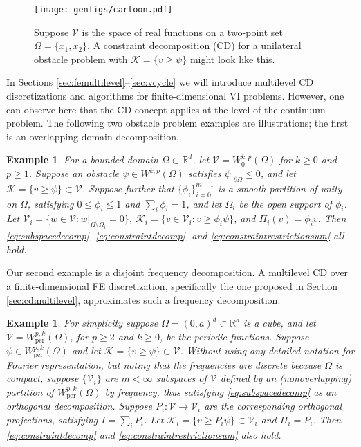 \documentclass[letterpaper,final,12pt,reqno]{amsart}
\theoremstyle{cstyle}
\theoremstyle{cstyle*}
\theoremstyle{dstyle}
\newtheorem{example}[theorem]{Example}
\numberwithin{equation}{section}
\numberwithin{figure}{section}
\numberwithin{table}{section}
\numberwithin{theorem}{section}
\newcommand{\RR}{\mathbb{R}}
\newcommand{\cK}{\mathcal{K}}
\newcommand{\cV}{\mathcal{V}}
\begin{document}
\begin{figure}[ht]
\texttt{[image: genfigs/cartoon.pdf]}
\caption{Suppose $\mathcal{V}$ is the space of real functions on a two-point set $\Omega=\{x_1,x_2\}$.  A constraint decomposition (CD) for a unilateral obstacle problem with $\mathcal{K}=\{v\ge \psi\}$ might look like this.}
\label{fig:cartoon}
\end{figure}

In Sections \ref{sec:femultilevel}--\ref{sec:vcycle} we will introduce multilevel CD discretizations and algorithms for finite-dimensional VI problems.  However, one can observe here that the CD concept applies at the level of the continuum problem.  The following two obstacle problem examples are illustrations; the first is an overlapping domain decomposition.

\begin{example}  \label{ex:domaindecomposition}  For a bounded domain $\Omega \subset \RR^d$, let $\cV = W_0^{k,p}(\Omega)$ for $k\ge 0$ and $p\ge 1$.  Suppose an obstacle $\psi \in W^{k,p}(\Omega)$ satisfies $\psi|_{\partial \Omega} \le 0$, and let $\cK = \{v \ge \psi\} \subset \cV$.  Suppose further that $\{\phi_i\}_{i=0}^{m-1}$ is a smooth partition of unity on $\Omega$, satisfying $0 \le \phi_i\le 1$ and $\sum_i \phi_i = 1$, and let $\Omega_i$ be the open support of $\phi_i$.  Let $\cV_i = \{w \in \cV:w|_{\Omega \setminus \Omega_i} =0 \}$, $\cK_i = \{v \in \cV_i: v \ge \phi_i \psi\}$, and $\Pi_i(v) = \phi_i v$.  Then \eqref{eq:subspacedecomp}, \eqref{eq:constraintdecomp}, and \eqref{eq:constraintrestrictionsum} all hold.
\end{example}

Our second example is a disjoint frequency decomposition.  A multilevel CD over a finite-dimensional FE discretization, specifically the one proposed in Section \ref{sec:cdmultilevel}, approximates such a frequency decomposition.

\begin{example}  \label{ex:frequencydecomposition}  For simplicity suppose $\Omega = (0,a)^d \subset \RR^d$ is a cube, and let $\cV = W_{\text{per}}^{p,k}(\Omega)$, for $p\ge 2$ and $k\ge 0$, be the periodic functions.  Suppose $\psi \in W_{\text{per}}^{p,k}(\Omega)$ and let $\cK = \{v \ge \psi\} \subset \cV$.  Without using any detailed notation for Fourier representation, but noting that the frequencies are discrete because $\Omega$ is compact, suppose $\{\cV_i\}$ are $m<\infty$ subspaces of $\cV$ defined by an (nonoverlapping) partition of $W_{\text{per}}^{p,k}(\Omega)$ by frequency, thus satisfying \eqref{eq:subspacedecomp} as an orthogonal decomposition.  Suppose $P_i:\cV \to \cV_i$ are the corresponding orthogonal projections, satisfying $I = \sum_i P_i$.  Let $\cK_i = \{v \ge P_i \psi\} \subset \cV_i$ and $\Pi_i = P_i$.  Then \eqref{eq:constraintdecomp} and \eqref{eq:constraintrestrictionsum} also hold.
\end{example}
\end{document}
